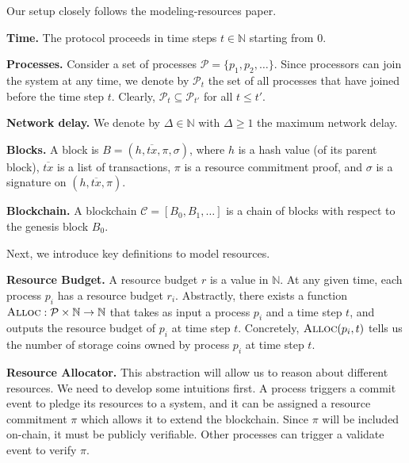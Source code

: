\documentclass[12pt,draftcls,onecolumn]{IEEEtran}
\newcommand{\Alloc}{\textsc{Alloc}}
\begin{document}





Our setup closely follows the modeling-resources paper.


{\bf Time.} The protocol proceeds in time steps $t \in \mathbb{N}$ starting from $0$.

{\bf Processes.} Consider a set of processes $\mathcal{P} = \{ p_1, p_2, \ldots \}$. Since processors can join the system at any time,
we denote by $\mathcal{P}_t$ the set of all processes that have joined before the time step $t$. Clearly, $\mathcal{P}_t \subseteq \mathcal{P}_{t'}$ 
for all $t \le t'$.

{\bf Network delay.} We denote by $\Delta \in \mathbb{N}$ with $\Delta \ge 1$ the maximum network delay.

{\bf Blocks.} A block is $B = (h, \overline{tx}, \pi, \sigma)$, where $h$ is a hash value (of its parent block), $\overline{tx}$ is a list of transactions,
$\pi$ is a resource commitment proof, and $\sigma$ is a signature on $(h, \overline{tx}, \pi)$.

{\bf Blockchain.} A blockchain $\mathcal{C} = [B_0, B_1, \ldots]$ is a chain of blocks with respect to the genesis block $B_0$.

Next, we introduce key definitions to model resources.

{\bf Resource Budget.} A resource budget $r$ is a value in $\mathbb{N}$. At any given time, each process $p_i$ has a resource budget $r_i$.
Abstractly, there exists a function $\Alloc: \mathcal{P} \times \mathbb{N} \to \mathbb{N}$ that takes as input a process $p_i$
and a time step $t$, and outputs the resource budget of $p_i$ at time step $t$. Concretely, $\Alloc(p_i, t)$ tells us the number of storage coins
owned by process $p_i$ at time step $t$.

{\bf Resource Allocator.} This abstraction will allow us to reason about different resources. We need to develop some intuitions first. 
A process triggers a commit event to pledge its resources to a system, and it can be assigned a resource commitment $\pi$ which allows it to extend the blockchain. Since $\pi$ will be included on-chain, it must be publicly verifiable. Other processes can trigger a validate event to verify $\pi$.
\end{document}
